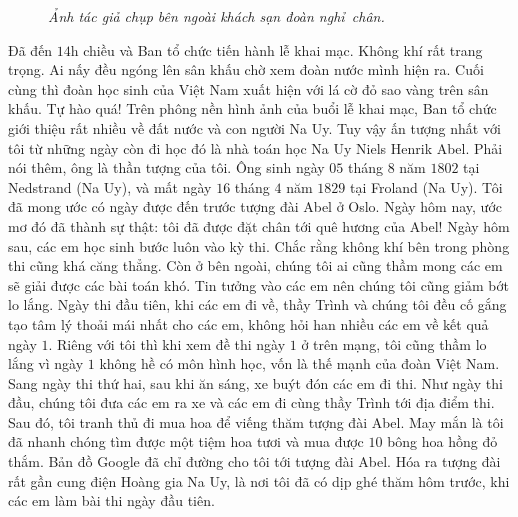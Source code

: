 \begin{multicols}{2}
\begin{figure}[H]
		\caption{\small\textit{\color{cackithi}Ảnh tác giả chụp bên ngoài khách sạn đoàn nghỉ~chân.}}
		\vspace*{-10pt}
	\end{figure}
	Đã đến $14$h chiều và Ban tổ chức tiến hành lễ khai mạc. Không khí rất trang trọng. Ai nấy đều ngóng lên sân khấu chờ xem đoàn nước mình hiện ra. Cuối cùng thì đoàn học sinh của Việt Nam xuất hiện với lá cờ đỏ sao vàng trên sân khấu. Tự hào quá! 
	\vskip 0.05cm
	Trên phông nền hình ảnh của buổi lễ khai mạc, Ban tổ chức giới thiệu rất nhiều về đất nước và con người Na Uy. Tuy vậy ấn tượng nhất với tôi từ những ngày còn đi học đó là nhà toán học Na Uy Niels Henrik Abel. Phải nói thêm, ông là thần tượng của tôi. Ông sinh ngày $05$ tháng $8$ năm $1802$ tại  Nedstrand (Na Uy), và mất ngày $16$ tháng $4$ năm $1829$ tại Froland (Na Uy). Tôi đã mong ước có ngày được đến trước tượng đài Abel ở Oslo. Ngày hôm nay, ước mơ đó đã thành sự thật: tôi đã được đặt chân tới quê hương của Abel! 
	\vskip 0.05cm
	Ngày hôm sau, các em học sinh bước luôn vào kỳ thi. Chắc rằng không khí bên trong phòng thi cũng khá căng thẳng. Còn ở bên ngoài, chúng tôi ai cũng thầm mong các em sẽ giải được các bài toán khó. Tin tưởng vào các em nên chúng tôi cũng giảm bớt lo lắng. 
	\vskip 0.05cm
	Ngày thi đầu tiên, khi các em đi về, thầy Trình và chúng tôi đều cố gắng tạo tâm lý thoải mái nhất cho các em, không hỏi han nhiều các em về kết quả ngày $1$. Riêng với tôi thì khi xem đề thi ngày $1$ ở trên mạng, tôi cũng thầm lo lắng vì ngày $1$ không hề có môn hình học, vốn là thế mạnh của đoàn Việt Nam.
	\vskip 0.05cm
	Sang ngày thi thứ hai, sau khi ăn sáng, xe buýt đón các em đi thi. Như ngày thi đầu, chúng tôi đưa các em ra xe và các em đi cùng thầy Trình tới địa điểm thi. Sau đó, tôi tranh thủ đi mua hoa để viếng thăm tượng đài Abel. May mắn là tôi đã nhanh chóng tìm được một tiệm hoa tươi và mua được $10$ bông hoa hồng đỏ thắm. Bản đồ Google đã chỉ đường cho tôi tới tượng đài Abel. Hóa ra tượng đài rất gần cung điện Hoàng gia Na Uy, là nơi tôi đã có dịp ghé thăm hôm trước, khi các em làm bài thi ngày đầu tiên.
	\vskip 0.05cm

\end{multicols}
